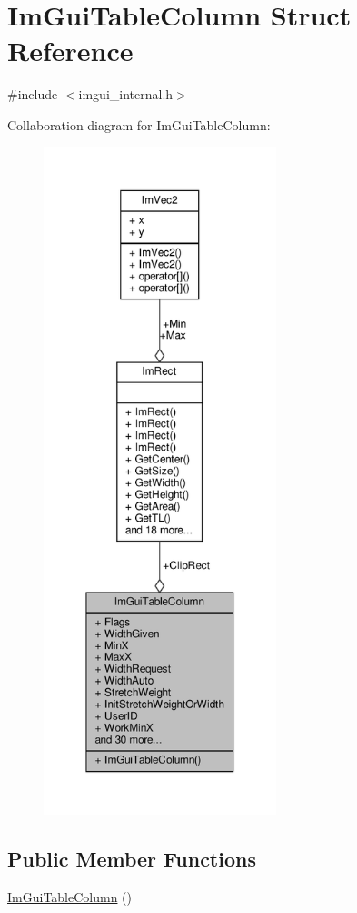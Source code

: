 \hypertarget{structImGuiTableColumn}{}\section{Im\+Gui\+Table\+Column Struct Reference}
\label{structImGuiTableColumn}


{\ttfamily \#include $<$imgui\+\_\+internal.\+h$>$}



Collaboration diagram for Im\+Gui\+Table\+Column\+:
\nopagebreak
\begin{figure}[H]
\begin{center}
\leavevmode
\includegraphics[height=550pt]{structImGuiTableColumn__coll__graph}
\end{center}
\end{figure}
\subsection*{Public Member Functions}
\begin{DoxyCompactItemize}
\item 
\hyperlink{structImGuiTableColumn_a6f0d942628f0d659d9227b1b2645e0dd}{Im\+Gui\+Table\+Column} ()
\end{DoxyCompactItemize}
